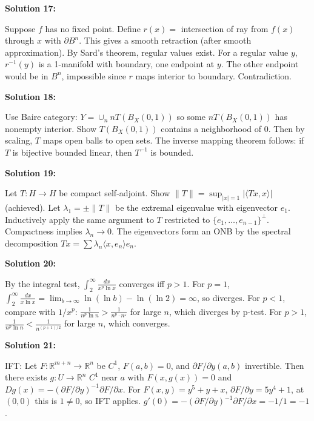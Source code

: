 \documentclass[12pt,a4paper]{exam}
\begin{document}
\vspace{0.5cm}

\textbf{Solution 17:}

Suppose $f$ has no fixed point. Define $r(x) =$ intersection of ray from $f(x)$ through $x$ with $\partial B^n$. This gives a smooth retraction (after smooth approximation). By Sard's theorem, regular values exist. For a regular value $y$, $r^{-1}(y)$ is a 1-manifold with boundary, one endpoint at $y$. The other endpoint would be in $B^n$, impossible since $r$ maps interior to boundary. Contradiction.

\vspace{0.5cm}

\textbf{Solution 18:}

Use Baire category: $Y = \cup_n n T(B_X(0,1))$ so some $nT(B_X(0,1))$ has nonempty interior. Show $T(B_X(0,1))$ contains a neighborhood of 0. Then by scaling, $T$ maps open balls to open sets. The inverse mapping theorem follows: if $T$ is bijective bounded linear, then $T^{-1}$ is bounded.

\vspace{0.5cm}

\textbf{Solution 19:}

Let $T: H \to H$ be compact self-adjoint. Show $\|T\| = \sup_{|x|=1} |\langle Tx, x \rangle|$ (achieved). Let $\lambda_1 = \pm\|T\|$ be the extremal eigenvalue with eigenvector $e_1$. Inductively apply the same argument to $T$ restricted to $\{e_1,\ldots,e_{n-1}\}^\perp$. Compactness implies $\lambda_n \to 0$. The eigenvectors form an ONB by the spectral decomposition $Tx = \sum \lambda_n \langle x, e_n \rangle e_n$.

\vspace{0.5cm}

\textbf{Solution 20:}

By the integral test, $\int_2^{\infty} \frac{dx}{x^p \ln x}$ converges iff $p > 1$. For $p=1$, $\int_2^{\infty} \frac{dx}{x \ln x} = \lim_{b \to \infty} \ln(\ln b) - \ln(\ln 2) = \infty$, so diverges. For $p<1$, compare with $1/x^p$: $\frac{1}{n^p \ln n} > \frac{1}{n^p \cdot n^{\varepsilon}}$ for large $n$, which diverges by p-test. For $p>1$, $\frac{1}{n^p \ln n} < \frac{1}{n^{(p+1)/2}}$ for large $n$, which converges.

\vspace{0.5cm}

\textbf{Solution 21:}

IFT: Let $F: \mathbb{R}^{m+n} \to \mathbb{R}^n$ be $C^1$, $F(a,b)=0$, and $\partial F/\partial y (a,b)$ invertible. Then there exists $g: U \to \mathbb{R}^n$ $C^1$ near $a$ with $F(x,g(x))=0$ and $Dg(x) = -(\partial F/\partial y)^{-1} \partial F/\partial x$. For $F(x,y) = y^5 + y + x$, $\partial F/\partial y = 5y^4 + 1$, at $(0,0)$ this is $1 \neq 0$, so IFT applies. $g'(0) = - (\partial F/\partial y)^{-1} \partial F/\partial x = -1/1 = -1$.
\end{document}
